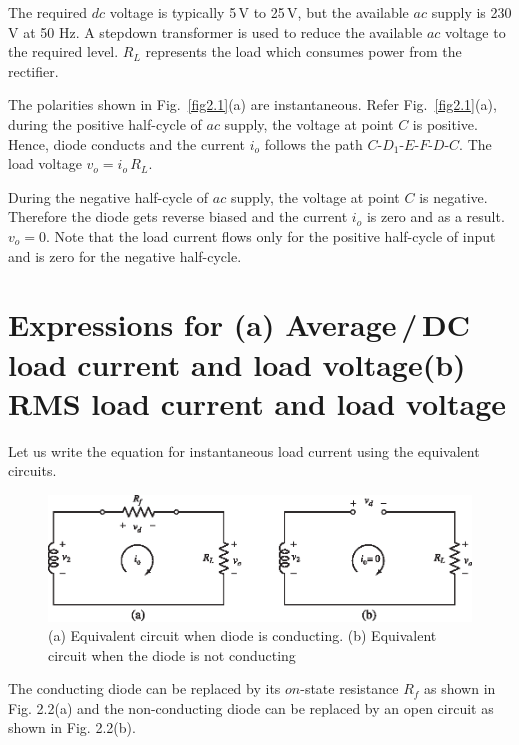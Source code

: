 The required $dc$ voltage is typically 5\,V to 25\,V, but the available
$ac$ supply is 230 V at 50 Hz. A stepdown  transformer is used to
reduce the available $ac$ voltage to the required level. $R_L$
represents the load which consumes power from the rectifier.

The polarities shown in Fig.~\ref{fig2.1}(a) are instantaneous. Refer
Fig.~\ref{fig2.1}(a), during the positive half-cycle of $ac$ supply, the
voltage at point $C$ is positive. Hence, diode conducts and the
current $i_o$ follows the path $C$-$D_1$-$E$-$F$-$D$-$C$. The load
voltage $v_o = i_o\, R_L$.

During the negative half-cycle of $ac$ supply, the voltage at point
$C$ is negative. Therefore the diode gets reverse biased and the
current $i_o$ is zero and as a result. $v_o =0$. Note that the load
current flows only for the positive half-cycle of input and is zero for the
negative half-cycle.

\section{Expressions for (a) Average\,/\,DC load current and load voltage\newline (b) RMS load current and load voltage}\label{sec2.3}

\smallskip


Let us write the equation for instantaneous load current using the
equivalent circuits.
\begin{figure}[H]
\centering
\includegraphics{chap2/add-fig/S3-EE-02-002ab.eps}
\caption{(a) Equivalent circuit when diode is conducting. (b) Equivalent circuit when the diode is not conducting}\label{fig2.2}
\end{figure}

The conducting diode can be replaced by its $on$-state resistance
$R_f$ as shown in Fig. 2.2(a) and the non-conducting diode can be
replaced by an open circuit as shown in Fig. 2.2(b).

